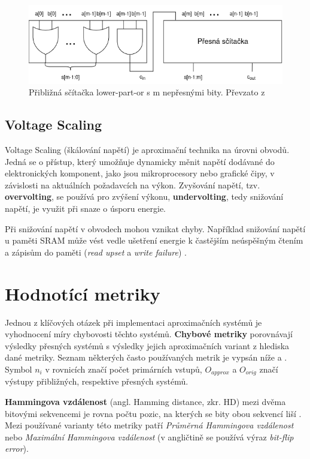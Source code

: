 \begin{figure}[H]
    \centering
    \includegraphics[width=\textwidth]{obrazky-figures/scitacka.png}
    \caption{Přibližná sčítačka lower-part-or s m nepřesnými bity. Převzato z \cite{log_mults}}
    \label{fig:approx_adder}
\end{figure}

\subsection*{Voltage Scaling}
Voltage Scaling (škálování napětí) je aproximační technika na úrovni obvodů. Jedná se o přístup, který umožňuje dynamicky měnit napětí dodávané do elektronických komponent, jako jsou mikroprocesory nebo grafické čipy, v závislosti na aktuálních požadavcích na výkon. Zvyšování napětí, tzv. \textbf{overvolting}, se používá pro zvýšení výkonu, \textbf{undervolting}, tedy snižování napětí, je využit při snaze o úsporu energie.

Při snižování napětí v obvodech mohou vznikat chyby. Například snižování napětí u paměti SRAM může vést vedle ušetření energie k častějším neúspěšným čtením a zápisům do paměti (\textit{read upset} a \textit{write failure}) \cite{ac_techniques}.

\section{Hodnotící metriky} \label{error_metrics}
Jednou z klíčových otázek při implementaci aproximačních systémů je vyhodnocení míry chybovosti těchto systémů. \textbf{Chybové metriky} porovnávají výsledky přesných systémů s výsledky jejich aproximačních variant z hlediska dané metriky. Seznam některých často používaných metrik je vypsán níže \cite{circuit_library} a \cite{error_metrics}. Symbol $n_i$ v rovnicích značí počet primárních vstupů, $O_{approx}$ a $O_{orig}$ značí výstupy přibližných, respektive přesných systémů.

\bigskip

\textbf{Hammingova vzdálenost} (angl. Hamming distance, zkr. HD) mezi dvěma bitovými sekvencemi je rovna počtu pozic, na kterých se bity obou sekvencí liší \cite{hamming_dist}. Mezi používané varianty této metriky patří \textit{Průměrná Hammingova vzdálenost} nebo \textit{Maximální Hammingova vzdálenost} (v angličtině se používá výraz \textit{bit-flip error}).

